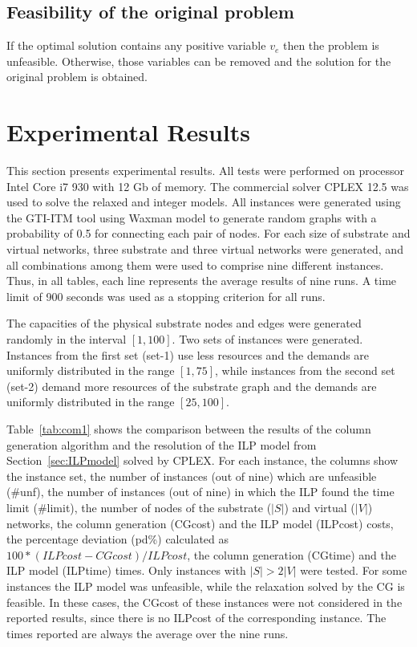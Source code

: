 \documentclass[12pt]{article}
\begin{document}
\subsection{Feasibility of the original problem}
If the optimal solution contains any positive variable $v_{e}$ then the problem is unfeasible.
Otherwise, those variables can be removed and the solution for the original problem is obtained.

\section{Experimental Results}
\label{sec:results}
This section presents experimental results. All tests were performed on processor Intel Core i7 930 with 12 Gb of memory. 
The commercial solver CPLEX 12.5 was used to solve the relaxed and integer models. 
All instances were generated using the GTI-ITM tool \cite{Zagura:96} using Waxman model to generate random graphs with a probability of 0.5 for connecting each pair of nodes.
For each size of substrate and virtual networks, three substrate and three virtual networks were generated, and all combinations among them were used to comprise nine different instances. Thus, in all tables, each line represents the average results of nine runs. A time limit of 900 seconds was used as a stopping criterion for all runs.

The capacities of the physical substrate nodes and edges were generated randomly in the interval $[1,100]$.
Two sets of instances were generated. Instances from the first set (set-1) use less resources and the demands are uniformly distributed in the range $[1,75]$, while instances from the second set (set-2) demand more resources of the substrate graph and the demands are uniformly distributed in the range $[25,100]$.

Table~\ref{tab:com1} shows the comparison between the results of the column generation algorithm and the resolution of the ILP model from Section~\ref{sec:ILPmodel} solved by CPLEX.
For each instance, the columns show the instance set, the number of instances (out of nine) which are unfeasible (\#unf), the number of instances (out of nine) in which the ILP found the time limit (\#limit), the number of nodes of the substrate ($|S|$) and virtual ($|V|$) networks, the column generation (CGcost) and the ILP model (ILPcost) costs, the percentage deviation (pd\%) calculated as $100*(ILPcost-CGcost)/ILPcost$, the column generation (CGtime) and the ILP model (ILPtime) times. 
Only instances with $|S| > 2|V|$ were tested.
For some instances the ILP model was unfeasible, while the relaxation solved by the CG is feasible. 
In these cases, the CGcost of these instances were not considered in the reported results, since there is no ILPcost of the corresponding instance.
The times reported are always the average over the nine runs.
\end{document}

